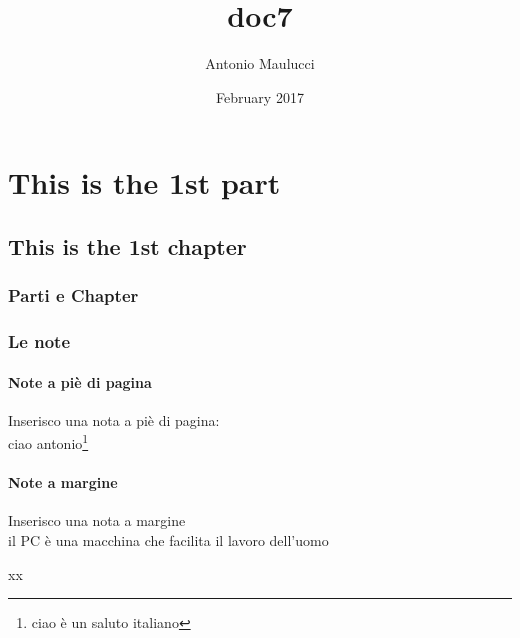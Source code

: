 \documentclass{article}
\title{doc7}
\author{Antonio Maulucci}
\date{February 2017}
\begin{document}
\maketitle


\part{This is the 1st part}


\chapter{This is the 1st chapter}

\section{Parti e Chapter}

\section{Le note}

\subsection{Note a piè di pagina}

Inserisco una nota a piè di pagina: \\ ciao antonio\footnote{ciao è un saluto italiano}

\subsection{Note a margine}

Inserisco una nota a margine \\ il PC è una macchina che facilita il lavoro dell'uomo

\vspace{1cm} %

xx
\end{document}
